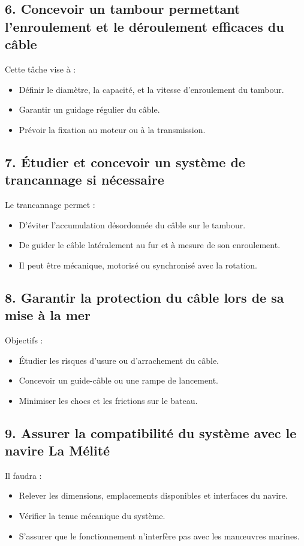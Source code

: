 \documentclass[a4paper,11pt]{article}
\begin{document}
\subsection*{6. Concevoir un tambour permettant l'enroulement et le déroulement efficaces du câble}
Cette tâche vise à :
\begin{itemize}
  \item Définir le diamètre, la capacité, et la vitesse d’enroulement du tambour.
  \item Garantir un guidage régulier du câble.
  \item Prévoir la fixation au moteur ou à la transmission.
\end{itemize}

\subsection*{7. Étudier et concevoir un système de trancannage si nécessaire}
Le trancannage permet :
\begin{itemize}
  \item D’éviter l’accumulation désordonnée du câble sur le tambour.
  \item De guider le câble latéralement au fur et à mesure de son enroulement.
  \item Il peut être mécanique, motorisé ou synchronisé avec la rotation.
\end{itemize}

\subsection*{8. Garantir la protection du câble lors de sa mise à la mer}
Objectifs :
\begin{itemize}
  \item Étudier les risques d’usure ou d’arrachement du câble.
  \item Concevoir un guide-câble ou une rampe de lancement.
  \item Minimiser les chocs et les frictions sur le bateau.
\end{itemize}

\subsection*{9. Assurer la compatibilité du système avec le navire La Mélité}
Il faudra :
\begin{itemize}
  \item Relever les dimensions, emplacements disponibles et interfaces du navire.
  \item Vérifier la tenue mécanique du système.
  \item S’assurer que le fonctionnement n’interfère pas avec les manœuvres marines.
\end{itemize}
\end{document}

